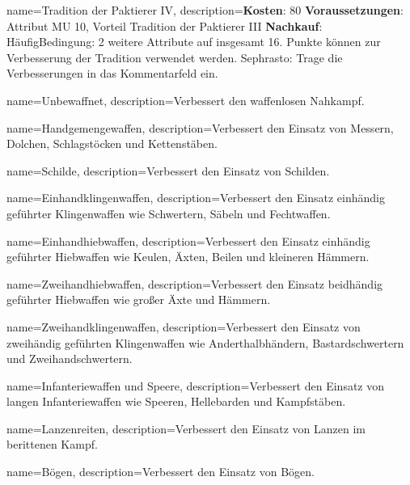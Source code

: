 {
    name={Tradition der Paktierer IV},
    description={\textbf{Kosten}: 80 \textbf{Voraussetzungen}: Attribut MU 10, Vorteil Tradition der Paktierer III \textbf{Nachkauf}: Häufig\newline Bedingung: 2 weitere Attribute auf insgesamt 16. Punkte können zur Verbesserung der Tradition verwendet werden. Sephrasto: Trage die Verbesserungen in das Kommentarfeld ein.}
}


{
    name={Unbewaffnet},
    description={Verbessert den waffenlosen Nahkampf.}
}


{
    name={Handgemengewaffen},
    description={Verbessert den Einsatz von Messern, Dolchen, Schlagstöcken und Kettenstäben.}
}


{
    name={Schilde},
    description={Verbessert den Einsatz von Schilden.}
}


{
    name={Einhandklingenwaffen},
    description={Verbessert den Einsatz einhändig geführter Klingenwaffen wie Schwertern, Säbeln und Fechtwaffen.}
}


{
    name={Einhandhiebwaffen},
    description={Verbessert den Einsatz einhändig geführter Hiebwaffen wie Keulen, Äxten, Beilen und kleineren Hämmern.}
}


{
    name={Zweihandhiebwaffen},
    description={Verbessert den Einsatz beidhändig geführter Hiebwaffen wie großer Äxte und Hämmern.}
}


{
    name={Zweihandklingenwaffen},
    description={Verbessert den Einsatz von zweihändig geführten Klingenwaffen wie Anderthalbhändern, Bastardschwertern und Zweihandschwertern.}
}


{
    name={Infanteriewaffen und Speere},
    description={Verbessert den Einsatz von langen Infanteriewaffen wie Speeren, Hellebarden und Kampfstäben.}
}


{
    name={Lanzenreiten},
    description={Verbessert den Einsatz von Lanzen im berittenen Kampf.}
}


{
    name={Bögen},
    description={Verbessert den Einsatz von Bögen.}
}



